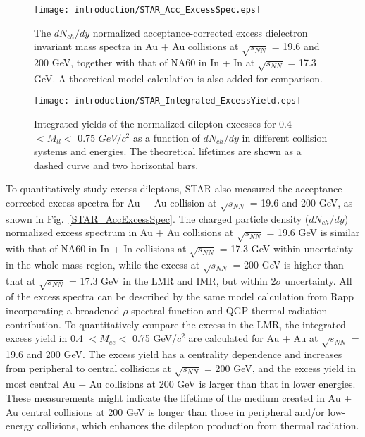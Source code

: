\begin{figure}[htbp]
\begin{minipage}[htbp]{0.49\linewidth}
\centering
\texttt{[image: introduction/STAR\_Acc\_ExcessSpec.eps]}
\caption{The $dN_{ch}/dy$ normalized acceptance-corrected excess dielectron invariant mass spectra in Au + Au collisions at $\sqrt{s_{NN}}$ = 19.6 and 200 GeV, together with that of NA60 in In + In at $\sqrt{s_{NN}}$ = 17.3 GeV. A theoretical model calculation is also added for comparison.\label{STAR_AccExcessSpec}}
\end{minipage}
\hfill
\begin{minipage}[htbp]{0.49\linewidth}
\centering
\texttt{[image: introduction/STAR\_Integrated\_ExcessYield.eps]} 
\caption{Integrated yields of the normalized dilepton excesses for 0.4 $<M_{ll}<$ 0.75 $GeV/c^{2}$ as a function of $dN_{ch}/dy$ in different collision systems and energies. The theoretical lifetimes are shown as a dashed curve and two horizontal bars.\label{STAR_AccExcessYield}}
\end{minipage}
\end{figure}

To quantitatively study excess dileptons, STAR also measured the acceptance-corrected excess spectra for Au + Au collision at $\sqrt{s_{NN}}$ = 19.6 and 200 GeV, as shown in Fig.~\ref{STAR_AccExcessSpec}. The charged particle density ($dN_{ch}/dy$) normalized excess spectrum in Au + Au collisions at $\sqrt{s_{NN}}$ = 19.6 GeV is similar with that of NA60 in In + In collisions at $\sqrt{s_{NN}}$ = 17.3 GeV within uncertainty in the whole mass region, while the excess at $\sqrt{s_{NN}}$ = 200 GeV is higher than that at $\sqrt{s_{NN}}$ = 17.3 GeV in the LMR and IMR, but within 2$\sigma$ uncertainty. All of the excess spectra can be described by the same model calculation from Rapp incorporating a broadened $\rho$ spectral function and QGP thermal radiation contribution. To quantitatively compare the excess in the LMR, the integrated excess yield in 0.4 $<M_{ee}<$ 0.75 GeV/$c^{2}$ are calculated for Au + Au at $\sqrt{s_{NN}}$ = 19.6 and 200 GeV. The excess yield has a centrality dependence and increases from peripheral to central collisions at $\sqrt{s_{NN}}$ = 200 GeV, and the excess yield in most central Au + Au collisions at 200 GeV is larger than that in lower energies. These measurements might indicate the lifetime of the medium created in Au + Au central collisions at 200 GeV is longer than those in peripheral and/or low-energy collisions, which enhances the dilepton production from thermal radiation.
 
